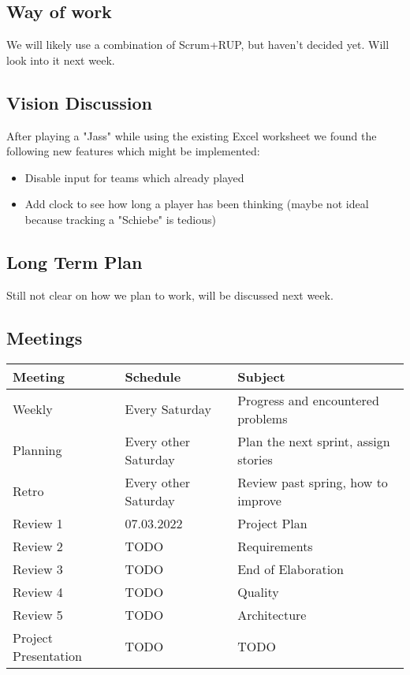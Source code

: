 \subsection{Way of work}

We will likely use a combination of Scrum+RUP, but haven't decided yet. Will look into it next week.

\subsection{Vision Discussion}

After playing a "Jass" while using the existing Excel worksheet we found the following new features which might be implemented:

\begin{itemize}
    \item Disable input for teams which already played
    \item Add clock to see how long a player has been thinking (maybe not ideal because tracking a "Schiebe" is tedious)
\end{itemize}

\subsection{Long Term Plan}

Still not clear on how we plan to work, will be discussed next week.

\subsection{Meetings}

\begin{table}[H]
    \begin{tabular}{l|l|l}
    \textbf{Meeting} & \textbf{Schedule} & \textbf{Subject} \\
    \hline
    Weekly & Every Saturday & Progress and encountered problems \\
    Planning & Every other Saturday & Plan the next sprint, assign stories \\
    Retro & Every other Saturday & Review past spring, how to improve \\
    Review 1 & 07.03.2022 & Project Plan \\
    Review 2 & TODO & Requirements \\
    Review 3 & TODO & End of Elaboration \\
    Review 4 & TODO & Quality \\
    Review 5 & TODO & Architecture \\
    Project Presentation & TODO & TODO
    \end{tabular}
\end{table}

